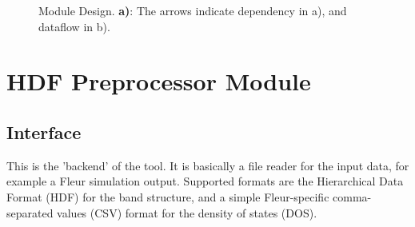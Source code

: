 \begin{figure}[htb!]
    \centering
    \hspace{5em}%
    \caption[Module Design.]{Module Design. \textbf{a)}: The arrows indicate
      dependency in a), and dataflow in b).}
    \label{fig:module-design}
\end{figure}


\section{HDF Preprocessor Module}
\label{sec:preprocessor-module}

\subsection{Interface}
\label{sec:preprocessor-interface}

This is the 'backend' of the tool. It is basically a file reader for the input
data, for example a Fleur simulation output. Supported formats are the
Hierarchical Data Format (HDF) \cite{hdf} for the band structure, and a simple
Fleur-specific comma-separated values (CSV) format for the density of states
(DOS).

